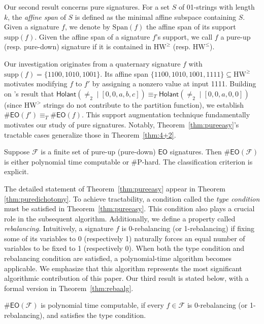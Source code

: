\documentclass[a4paper,UKenglish,cleveref, autoref, thm-restate]{lipics-v2021}
\newcommand{\hol}[0]{\textsf{Holant}}
\newcommand{\eo}[0]{\textsf{EO}}
\newcommand{\eog}[0]{\text{HW}^\geq}
\newcommand{\eol}[0]{\text{HW}^\leq}
\newcommand{\eosg}[0]{\text{HW}^>}
\newcommand{\hw}[1]{\text{HW}^{#1}}
\newcommand{\su}[0]{\text{supp}}
\newcommand{\ba}[1][0]{{{#1}-rebalancing}}
\begin{document}
Our second result concerns pure signatures. For a set $S$ of 01-strings with length $k$, the \textit{affine span} of $S$ is defined as the minimal affine subspace containing $S$. Given a signature $f$, we denote by $\mathrm{Span}(f)$ the affine span of its support $\su(f)$. Given the affine span of a signature $f$'s support, we call $f$ a pure-up (resp. pure-down) signature if it is contained in $\eog$ (resp. $\eol$). 

Our investigation originates from a quaternary signature $f$ with $\su(f)=\{1100,1010,1001\}$. Its affine span $\{1100,1010,1001,1111\}\subseteq\hw{\geq}$ motivates modifying $f$ to $f'$ by assigning a nonzero value at input 1111. Building on \cite{cai2013vanishing}'s result that $\hol(\neq_2\mid[0,0,a,b,c])\equiv_T\hol(\neq_2\mid[0,0,a,0,0])$ (since $\eosg$ strings do not contribute to the partition function), we establish $\#\eo(f')\equiv_T\#\eo(f)$. This support augmentation technique fundamentally motivates our study of pure signatures. Notably, Theorem~\ref{thm:pureeasy}'s tractable cases generalize those in Theorem~\ref{thm:4+2}.



\begin{theorem}\label{thm:pureeasy}
     Suppose $\mathcal{F}$ is a finite set of pure-up (pure-down) $\eo$ signatures. Then $\#\eo(\mathcal{F})$ is either polynomial time computable or \#P-hard. The classification criterion is explicit.
\end{theorem}

The detailed statement of Theorem~\ref{thm:pureeasy} appear in Theorem \ref{thm:puredichotomy}. To achieve tractability, a condition called the \textit{type condition} must be satisfied in Theorem~\ref{thm:pureeasy}. This condition also plays a crucial role in the subsequent algorithm. Additionally, we define a property called \textit{rebalancing}.
Intuitively, a signature $f$ is 0-rebalancing (or 1-rebalancing) if fixing some of its variables to 0 (respectively 1) naturally forces an equal number of variables to be fixed to 1 (respectively 0). When both the type condition and rebalancing condition are satisfied, a polynomial-time algorithm becomes applicable. We emphasize that this algorithm represents the most significant algorithmic contribution of this paper. Our third result is stated below, with a formal version in Theorem~\ref{thm:rebaalg}.
\begin{theorem}
    $\#\eo(\mathcal{F})$ is polynomial time computable, if every $f\in\mathcal{F}$ is \ba[0] (or \ba[1]), and satisfies the type condition.
    \label{thm:rebaeasy}
\end{theorem}
\end{document}
